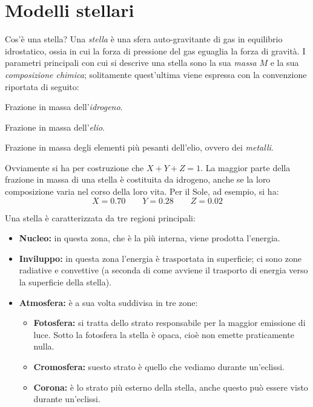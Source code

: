 \section{Modelli stellari}\label{sec:modelli-stellari}
Cos'è una stella? Una \emph{stella} è una sfera auto-gravitante di gas in equilibrio idrostatico, ossia in cui la forza di pressione del gas eguaglia la forza di gravità. I parametri principali con cui si descrive una stella sono la sua \emph{massa} $M$ e la sua \emph{composizione chimica}; solitamente quest'ultima viene espressa con la convenzione riportata di seguito:
\begin{description}\label{tab:composizione-chimica}
    \item[X] Frazione in massa dell'\emph{idrogeno}.
    \item[Y] Frazione in massa dell'\emph{elio}.
    \item[Z] Frazione in massa degli elementi più pesanti dell'elio, ovvero dei \emph{metalli}.
\end{description}
Ovviamente si ha per costruzione che $X + Y + Z = 1$. La maggior parte della frazione in massa di una stella è costituita da idrogeno, anche se la loro composizione varia nel corso della loro vita. Per il Sole, ad esempio, si ha:
\[
    X=0.70 \qquad Y=0.28 \qquad Z=0.02
\]

Una stella è caratterizzata da tre regioni principali:
\begin{itemize}
    \item \textbf{Nucleo:} in questa zona, che è la più interna, viene prodotta l'energia.
    \item \textbf{Inviluppo:} in questa zona l'energia è trasportata in superficie; ci sono zone radiative e convettive (a seconda di come avviene il trasporto di energia verso la superficie della stella).
    \item \textbf{Atmosfera:} è a sua volta suddivisa in tre zone:
    \begin{itemize}
        \item \textbf{Fotosfera:} si tratta dello strato responsabile per la maggior emissione di luce. Sotto la fotosfera la stella è opaca, cioè non emette praticamente nulla.
        \item \textbf{Cromosfera:} suesto strato è quello che vediamo durante un'eclissi.
        \item \textbf{Corona:} è lo strato più esterno della stella, anche questo può essere visto durante un'eclissi.
    \end{itemize}
\end{itemize}

